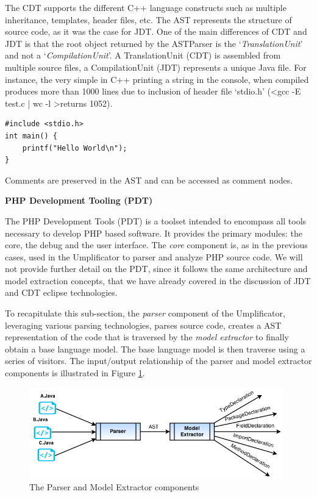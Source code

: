 The CDT supports the different C++ language constructs such as multiple inheritance, templates, header files, etc.
The AST represents the structure of source code, as it was the case for JDT.  One of the main differences of CDT and JDT is that the root object returned by the ASTParser is the `\textit{TranslationUnit}' and not a `\textit{CompilationUnit}'. 
A TranslationUnit (CDT) is assembled from multiple source files, a CompilationUnit (JDT) represents a unique Java file.
For instance, the very simple in C++ printing a string in the console, when compiled produces more than 1000 lines due to inclusion of header file `stdio.h' (\textless gcc -E test.c | wc -l \textgreater returns 1052).

\begin{lstlisting}[style=java, caption=Simple Example in C++ - test.c , label=lst:cdtsimple]
#include <stdio.h>
int main() {
	printf("Hello World\n");
}
\end{lstlisting}

Comments are preserved in the AST and can be accessed as comment nodes.

\textbf{PHP Development Tooling (PDT)}

The PHP Development Tools (PDT) is a toolset intended to encompass all tools necessary to develop PHP based software. 
It provides the primary modules: the core, the debug and the user interface. The \textit{core} component is, as in the previous cases, used in the Umplificator to parser and analyze PHP source code.
We will not provide further detail on the PDT, since it follows the same architecture and model extraction concepts, that we have already covered in the discussion of JDT and CDT eclipse technologies.

To recapitulate this sub-section, the \textit{parser} component of the Umplificator, leveraging various parsing technologies, parses source code, creates a AST representation of the code that is traversed by the \textit{model extractor} to finally obtain a base language model. The base language model is then traverse using a series of visitors. The input/output relationship of the parser and model extractor components is illustrated in Figure \ref{fig:parserINOut}. 

\begin{figure}[h]
\centering
\includegraphics[width=0.98\textwidth]{Figures/parserINOut.png}
\caption{The Parser and Model Extractor components}
\label{fig:parserINOut}
\end{figure}

